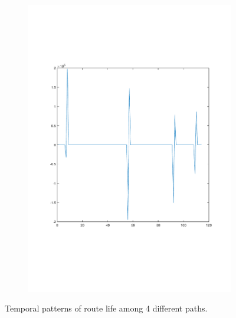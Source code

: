 \documentclass[sigconf]{acmart}
\begin{document}
\begin{figure}[tp]
\begin{subfigure}[t]{0.4\linewidth}
		\includegraphics[width=0.95\linewidth, trim={100 100 0 0}, clip]{fig/total_life_30}
		\label{fig:3.1d}
	\end{subfigure}
	\caption{Temporal patterns of route life among 4 different paths.}
	\label{fig:3.1}
\end{figure}
\end{document}
